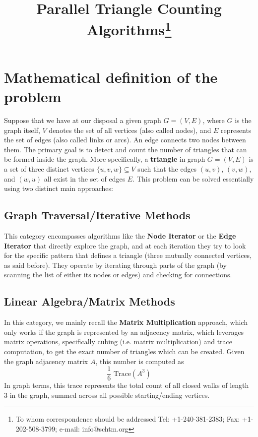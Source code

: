 \documentclass{aes2e}
\begin{document}


\title{Parallel Triangle Counting Algorithms\thanks{To whom correspondence should be addressed Tel: +1-240-381-2383; Fax: +1-202-508-3799; e-mail: info@schtm.org}}




\maketitle

\section{Mathematical definition of the problem}
Suppose that we have at our disposal a given graph $G = (V, E)$, where $G$ is the graph itself, $V$ denotes the set of all vertices (also called nodes), and $E$ represents the set of edges (also called links or arcs). An edge connects two nodes between them. The primary goal is to detect and count the number of triangles that can be formed inside the graph. More specifically, a \textbf{triangle} in graph $G = (V, E)$ is a set of three distinct vertices $\{u, v, w\} \subseteq V$ such that the edges $(u,v)$, $(v,w)$, and $(w,u)$ all exist in the set of edges $E$. This problem can be solved essentially using two distinct main approaches:
\subsection{Graph Traversal/Iterative Methods}
This category encompasses algorithms like the \textbf{Node Iterator} or the \textbf{Edge Iterator} that directly explore the graph, and at each iteration they try to look for the specific pattern that defines a triangle (three mutually connected vertices, as said before). They operate by iterating through parts of the graph (by scanning the list of either its nodes or edges) and checking for connections.
\subsection{Linear Algebra/Matrix Methods}
In this category, we mainly recall the \textbf{Matrix Multiplication} approach, which only works if the graph is represented by an adjacency matrix, which leverages matrix operations, specifically cubing (i.e. matrix multiplication) and trace computation, to get the exact number of triangles which can be created. Given the graph adjacency matrix $A$, this number is computed as $$\frac{1}{6} \text{ Trace}(A^3)$$ In graph terms, this trace represents the total count of all closed walks of length 3 in the graph, summed across all possible starting/ending vertices. 
\end{document}
